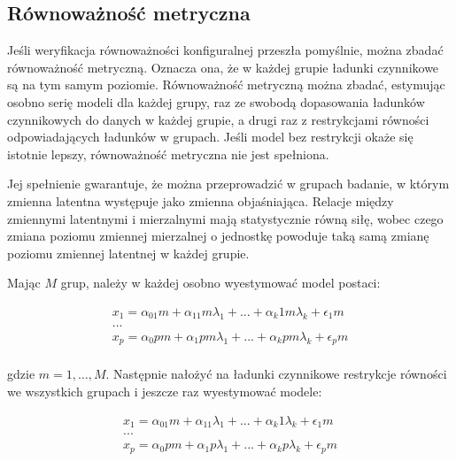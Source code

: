 \documentclass[12pt]{article}
\begin{document}
\hypertarget{ruxf3wnowaux17cnoux15bux107-metryczna}{%
\subsection{Równoważność metryczna}\label{ruxf3wnowaux17cnoux15bux107-metryczna}}

Jeśli weryfikacja równoważności konfiguralnej przeszła pomyślnie, można zbadać równoważność metryczną. Oznacza ona, że w każdej grupie ładunki czynnikowe są na tym samym poziomie. Równoważność metryczną można zbadać, estymując osobno serię modeli dla każdej grupy, raz ze swobodą dopasowania ładunków czynnikowych do danych w każdej grupie, a drugi raz z restrykcjami równości odpowiadających ładunków w grupach. Jeśli model bez restrykcji okaże się istotnie lepszy, równoważność metryczna nie jest spełniona.

Jej spełnienie gwarantuje, że można przeprowadzić w grupach badanie, w którym zmienna latentna występuje jako zmienna objaśniająca. Relacje między zmiennymi latentnymi i mierzalnymi mają statystycznie równą siłę, wobec czego zmiana poziomu zmiennej mierzalnej o jednostkę powoduje taką samą zmianę poziomu zmiennej latentnej w każdej grupie.

Mając \(M\) grup, należy w każdej osobno wyestymować model postaci:

\begin{equation}
\label{eq:group-model}
\begin{aligned} 
x_1 = \alpha_01m + \alpha_11m \lambda_1 + ... + \alpha_k1m \lambda_k + \epsilon_1m\\
...\\
x_p = \alpha_0pm + \alpha_1pm \lambda_1 + ... + \alpha_kpm \lambda_k + \epsilon_pm\\
\end{aligned}
\end{equation}

gdzie \(m = 1, …, M\). Następnie nałożyć na ładunki czynnikowe restrykcje równości we wszystkich grupach i jeszcze raz wyestymować modele:

\begin{equation}
\label{eq:restricted-loadings}
\begin{aligned} 
x_1 = \alpha_01m + \alpha_11 \lambda_1 + ... + \alpha_k1 \lambda_k + \epsilon_1m\\
...\\
x_p = \alpha_0pm + \alpha_1p \lambda_1 + ... + \alpha_kp \lambda_k + \epsilon_pm\\
\end{aligned}
\end{equation}
\end{document}
